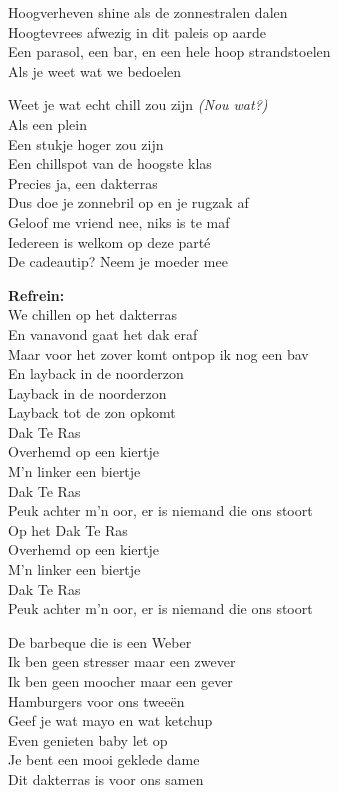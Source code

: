 Hoogverheven shine als de zonnestralen dalen\\
Hoogtevrees afwezig in dit paleis op aarde\\
Een parasol, een bar, en een hele hoop strandstoelen\\
Als je weet wat we bedoelen

Weet je wat echt chill zou zijn \textit{(Nou wat?)}\\
Als een plein\\
Een stukje hoger zou zijn\\
Een chillspot van de hoogste klas\\
Precies ja, een dakterras\\
Dus doe je zonnebril op en je rugzak af\\
Geloof me vriend nee, niks is te maf\\
Iedereen is welkom op deze parté\\
De cadeautip? Neem je moeder mee

\textbf{Refrein:}\\
We chillen op het dakterras\\
En vanavond gaat het dak eraf\\
Maar voor het zover komt ontpop ik nog een bav\\
En layback in de noorderzon\\
Layback in de noorderzon\\
Layback tot de zon opkomt\\
Dak Te Ras\\
Overhemd op een kiertje\\
M'n linker een biertje\\
Dak Te Ras\\
Peuk achter m'n oor, er is niemand die ons stoort\\
Op het Dak Te Ras\\
Overhemd op een kiertje\\
M'n linker een biertje\\
Dak Te Ras\\
Peuk achter m'n oor, er is niemand die ons stoort

De barbeque die is een Weber\\
Ik ben geen stresser maar een zwever\\
Ik ben geen moocher maar een gever\\
Hamburgers voor ons tweeën\\
Geef je wat mayo en wat ketchup\\
Even genieten baby let op\\
Je bent een mooi geklede dame\\
Dit dakterras is voor ons samen

